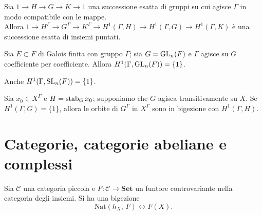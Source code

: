 \begin{proposition}
    Sia $1\rightarrow H\rightarrow G\rightarrow K\rightarrow 1$ una successione esatta di gruppi su cui agisce $\Gamma$ in modo compatibile con le mappe.\\
    Allora $1\rightarrow H^\Gamma\rightarrow G^\Gamma\rightarrow K^\Gamma\rightarrow H^1(\Gamma, H)\rightarrow H^1(\Gamma, G)\rightarrow H^1(\Gamma, K)$ è una successione esatta di insiemi puntati.
\end{proposition}

\begin{theorem}[Hilbert 90]
    Sia $E\subset F$ di Galois finita con gruppo $\Gamma$; sia $G=\operatorname{GL}_n(F)$ e $\Gamma$ agisce su $G$ coefficiente per coefficiente. Allora $H^1(\Gamma,\operatorname{GL}_n(F))=\{1\}$.
\end{theorem}

\begin{corollary}
    Anche $H^1(\Gamma,\operatorname{SL}_n(F))=\{1\}$.
\end{corollary}

\begin{proposition}
    Sia $x_0\in X^\Gamma$ e $H=\operatorname{stab}_G x_0$; supponiamo che $G$ agisca transitivamente su $X$. Se $H^1(\Gamma, G)=\{1\}$, allora le orbite di $G^\Gamma$ in $X^\Gamma$ sono in bigezione con $H^1(\Gamma, H)$.
\end{proposition}



\section{Categorie, categorie abeliane e complessi}

\begin{lemma}[di Yoneda]
	Sia $ \mathcal{C} $ una categoria piccola e $ F \colon \mathcal C \to \mathbf{Set} $ un funtore controvariante nella categoria degli insiemi. Si ha una bigezione
	\[ \text{Nat}(h_X, \, F) \leftrightarrow F(X). \] 
\end{lemma}

